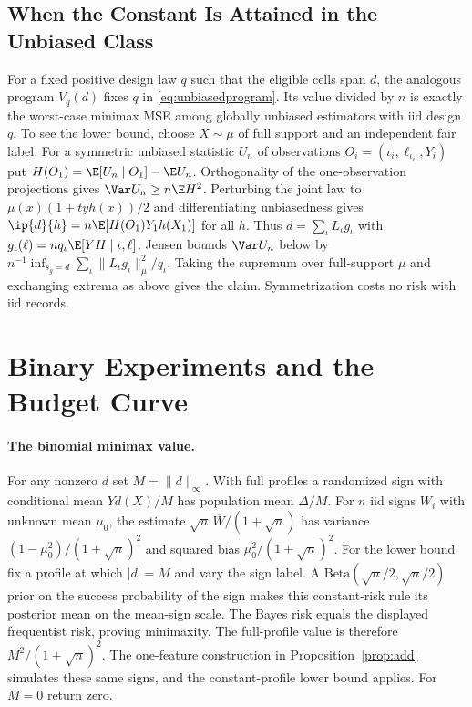 \subsection{When the Constant Is Attained in the Unbiased Class}
For a fixed positive design law $q$ such that the eligible cells span $d$, the analogous program $V_q(d)$ fixes $q$ in \eqref{eq:unbiasedprogram}. Its value divided by $n$ is exactly the worst-case minimax MSE among globally unbiased estimators with iid design $q$. To see the lower bound, choose $X\sim\mu$ of full support and an independent fair label. For a symmetric unbiased statistic $U_n$ of observations $O_i=(\iota_i,\ell_{\iota_i},Y_i)$ put $H(O_1)=\E[U_n\mid O_1]-\E U_n$. Orthogonality of the one-observation projections gives $\Var U_n\ge n\E H^2$. Perturbing the joint law to $\mu(x)(1+t y h(x))/2$ and differentiating unbiasedness gives $\ip{d}{h}=n\E[H(O_1)Y_1h(X_1)]$ for all $h$. Thus $d=\sum_\iota L_\iota g_\iota$ with $g_\iota(\ell)=nq_\iota\E[YH\mid \iota,\ell]$. Jensen bounds $\Var U_n$ below by $n^{-1}\inf_{s_g=d}\sum_\iota\|L_\iota g_\iota\|_\mu^2/q_\iota$. Taking the supremum over full-support $\mu$ and exchanging extrema as above gives the claim. Symmetrization costs no risk with iid records.





\section{Binary Experiments and the Budget Curve}\label{app:sign}
\paragraph{The binomial minimax value.}
For any nonzero $d$ set $M=\|d\|_\infty$. With full profiles a randomized sign with conditional mean $Yd(X)/M$ has population mean $\Delta/M$. For $n$ iid signs $W_i$ with unknown mean $\mu_0$, the estimate $\sqrt n\,\overline W/(1+\sqrt n)$ has variance $(1-\mu_0^2)/(1+\sqrt n)^2$ and squared bias $\mu_0^2/(1+\sqrt n)^2$. For the lower bound fix a profile at which $|d|=M$ and vary the sign label. A $\mathrm{Beta}(\sqrt n/2,\sqrt n/2)$ prior on the success probability of the sign makes this constant-risk rule its posterior mean on the mean-sign scale. The Bayes risk equals the displayed frequentist risk, proving minimaxity. The full-profile value is therefore $M^2/(1+\sqrt n)^2$. The one-feature construction in Proposition~\ref{prop:add} simulates these same signs, and the constant-profile lower bound applies. For $M=0$ return zero.

